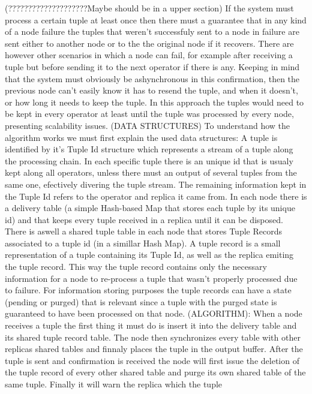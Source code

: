 \documentclass[times, 10pt,twocolumn]{article}
\begin{document}
(????????????????????Maybe should be in a upper section) If the system
must process a certain tuple at least once then there must a guarantee
that in any kind of a node failure the tuples that weren't successfuly
sent to a node in failure are sent either to another node or to the the
original node if it recovers. There are however other scenarios in which a
node can fail, for example after receiving a tuple but before sending it
to the next operator if there is any. Keeping in mind that the system must
obviously be ashynchronous in this confirmation, then the previous node
can't easily know it has to resend the tuple, and when it doesn't, or how
long it needs to keep the tuple.  In this approach the tuples would need
to be kept in every operator at least until the tuple was processed by
every node, presenting scalability issues.  (DATA STRUCTURES) To understand how the
algorithm works we must first explain the used data structures: A tuple is
identified by it's Tuple Id structure which represents a stream of a tuple
along the processing chain. In each specific tuple there is an unique id
that is usualy kept along all operators, unless there must an output of
several tuples from the same one, efectively divering the tuple stream.
The remaining information kept in the Tuple Id refers to the operator and
replica it came from. In each node there is a delivery table (a simple
Hash-based Map that stores each tuple by its unique id) and that keeps
every tuple received in a replica until it can be disposed.  There is
aswell a shared tuple table in each node that stores Tuple Records
associated to a tuple id (in a simillar Hash Map). A tuple record is a
small representation of a tuple containing its Tuple Id, as well as the
replica emiting the tuple record. This way the tuple record contains only
the necessary information for a node to re-process a tuple that wasn't
properly processed due to failure. For information storing purposes the
tuple records can have a state (pending or purged) that is relevant since
a tuple with the purged state is guaranteed to have been processed on that
node. (ALGORITHM): When a node receives a tuple the first thing it must do
is insert it into the delivery table and its shared tuple record table.
The node then synchronizes every table with other replicas shared tables
and finnaly places the tuple in the output buffer. After the tuple is sent
and confirmation is received the node will first issue the deletion of the
tuple record of every other shared table and purge its own shared table of
the same tuple. Finally it will warn the replica which the tuple
\end{document}
